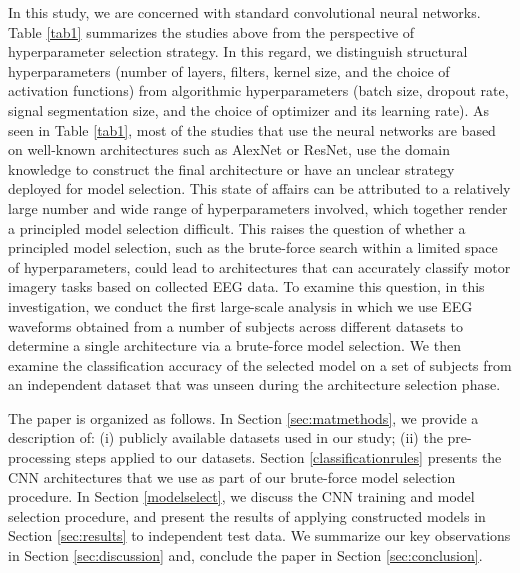 \documentclass{ieeeaccess}
\begin{document}
In this study, we are concerned with standard convolutional neural networks. Table \ref{tab1} summarizes the studies above from the perspective of hyperparameter selection strategy.  In this regard, we distinguish structural hyperparameters (number of layers, filters, kernel size, and the choice of activation functions) from algorithmic hyperparameters (batch size, dropout rate, signal segmentation size, and the choice of optimizer and its learning rate). 
As seen in Table \ref{tab1}, most of the studies that use the neural networks are based on well-known architectures such as AlexNet or ResNet, use the domain knowledge to construct the final architecture or have an unclear strategy deployed for model selection. This state of affairs can be attributed to a relatively large number and wide range of hyperparameters involved, which together render a principled model selection difficult. This raises the question of whether a principled model selection, such as the brute-force search within a limited space of hyperparameters, could lead to architectures that can accurately classify motor imagery tasks based on collected EEG data. To examine this question, in this investigation, we conduct the first large-scale analysis in which we use EEG waveforms obtained from a number of subjects across different datasets to determine a single architecture via a brute-force model selection. We then examine the classification accuracy of the selected model on a set of subjects from an independent dataset that was unseen during the architecture selection phase. 


The paper is organized as follows. In Section \ref{sec:matmethods},  we provide a description of: (i) publicly available datasets used in our study; (ii) the pre-processing steps applied to our datasets. Section \ref{classificationrules} presents the CNN architectures that we use as part of our brute-force model selection procedure. In Section \ref{modelselect}, we discuss the CNN training and model selection procedure, and present the results of applying constructed models in Section \ref{sec:results} to independent test data. We summarize our key observations in Section \ref{sec:discussion} and, conclude the paper in Section \ref{sec:conclusion}. 
\end{document}
